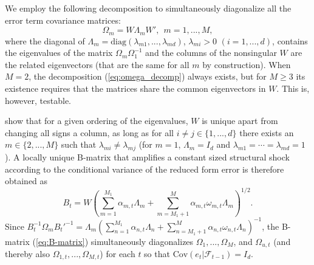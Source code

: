 \documentclass[nojss]{jss} %
\begin{document}
We employ the following decomposition to simultaneously diagonalize all the error term covariance matrices:
\begin{equation}\label{eq:omega_decomp}
\Omega_m = W\Lambda_mW',  \ \ m=1,...,M,
\end{equation}
where the diagonal of $\Lambda_m = \text{diag}(\lambda_{m1},...,\lambda_{md})$,  $\lambda_{mi}>0$ $(i=1,...,d)$,  contains the eigenvalues of the matrix $\Omega_m\Omega_1^{-1}$ and the columns of the nonsingular $W$ are the related eigenvectors (that are the same for all $m$ by construction).  When $M=2$,  the decomposition (\ref{eq:omega_decomp}) always exists, but for $M\geq 3$ its existence requires that the matrices share the common eigenvectors in $W$.  This is, however, testable.

\citet[Proposition 1]{Lanne+Lutkepohl+Maciejowska:2010} show that for a given ordering of the eigenvalues, $W$ is unique apart from changing all signs a column, as long as for all $i\neq j\in \lbrace 1,...,d \rbrace$ there exists an $m\in\lbrace 2,...,M \rbrace$ such that $\lambda_{mi}\neq\lambda_{mj}$ (for $m=1$,  $\Lambda_m=I_d$ and $\lambda_{m1}=\cdots = \lambda_{md}=1$).  A locally unique B-matrix that amplifies a constant sized structural shock according to the conditional variance of the reduced form error is therefore obtained as
\begin{equation}\label{eq:B-matrix}
B_t = W(\sum_{m=1}^{M_1}\alpha_{m,t}\Lambda_m + \sum_{m=M_1 + 1}^{M}\alpha_{m,t}\omega_{m,t}\Lambda_m)^{1/2}.
\end{equation}
Since $B_t^{-1}\Omega_mB_t'^{-1}=\Lambda_m(\sum_{n=1}^{M_1}\alpha_{n,t}\Lambda_n + \sum_{n=M_1+1}^M\alpha_{n,t}\omega_{n,t}\Lambda_n)^{-1}$,  the B-matrix (\ref{eq:B-matrix}) simultaneously diagonalizes $\Omega_{1},...,\Omega_{M}$, and $\Omega_{u,t}$ (and thereby also $\Omega_{1,t},...,\Omega_{M,t}$) for each $t$ so that $\text{Cov}(e_t|\mathcal{F}_{t-1}) = I_d$.
\end{document}
